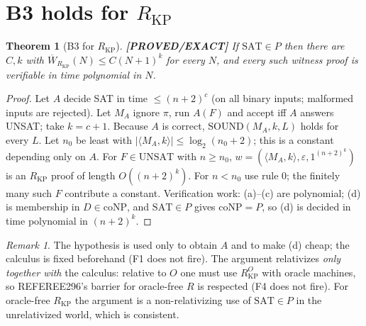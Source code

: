 \documentclass[11pt]{article}
\newtheorem{theorem}{Theorem}
\theoremstyle{definition}
\theoremstyle{remark}
\newtheorem*{remark}{Remark}
\newcommand{\SAT}{\mathrm{SAT}}
\newcommand{\UNSAT}{\mathrm{UNSAT}}
\newcommand{\coNP}{\mathrm{coNP}}
\newcommand{\Wb}{\overline W}
\newcommand{\RKP}{R_{\mathrm{KP}}}
\newcommand{\status}[1]{\textbf{[#1]}}
\begin{document}
\section{B3 holds for $\RKP$}
\begin{theorem}[B3 for $\RKP$]\label{thm:b3}
\status{PROVED/EXACT}
If $\SAT\in P$ then there are $C,k$ with $\Wb_{\RKP}(N)\le C(N+1)^k$ for every $N$, and every such
witness proof is verifiable in time polynomial in $N$.
\end{theorem}
\begin{proof}
Let $A$ decide SAT in time $\le(n+2)^c$ (on all binary inputs; malformed inputs are rejected). Let $M_A$ ignore
$\pi$, run $A(F)$ and accept iff $A$ answers UNSAT; take $k=c+1$. Because $A$ is correct, $\mathrm{SOUND}(M_A,k,L)$
holds for every $L$. Let $n_0$ be least with $|\langle M_A,k\rangle|\le\log_2(n_0+2)$; this is a constant
depending only on $A$. For $F\in\UNSAT$ with $n\ge n_0$, $w=(\langle M_A,k\rangle,\varepsilon,1^{(n+2)^k})$ is an
$\RKP$ proof of length $O((n+2)^k)$. For $n<n_0$ use rule 0; the finitely many such $F$ contribute a constant.
Verification work: (a)--(c) are polynomial; (d) is membership in $D\in\coNP$, and $\SAT\in P$ gives
$\coNP=P$, so (d) is decided in time polynomial in $(n+2)^k$.
\end{proof}

\begin{remark}
The hypothesis is used only to obtain $A$ and to make (d) cheap; the calculus is fixed beforehand (F1 does
not fire). The argument relativizes \emph{only together with} the calculus: relative to $O$ one must use
$\RKP^{O}$ with oracle machines, so REFEREE296's barrier for oracle-free $R$ is respected (F4 does not fire).
For oracle-free $\RKP$ the argument is a non-relativizing use of $\SAT\in P$ in the unrelativized world, which
is consistent.
\end{remark}
\end{document}
